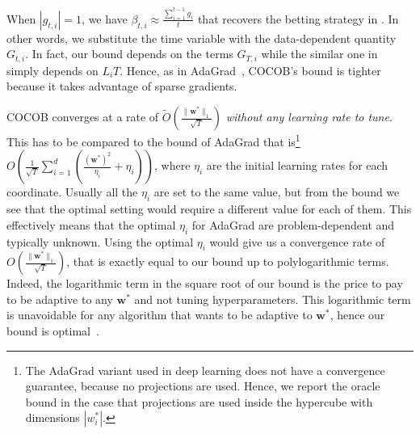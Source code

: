 \documentclass{article}
\newcommand{\bw}{\boldsymbol{w}}
\begin{document}
When $|g_{t,i}|=1$, we have $\beta_{t,i} \approx \tfrac{\sum_{i=1}^{t-1} g_i}{t}$ that recovers the betting strategy in \citet{OrabonaP16b}. In other words, we substitute the time variable with the 
data-dependent quantity $G_{t,i}$. In fact, our bound depends on the terms $G_{T,i}$ while the similar one in \citet{OrabonaP16b} simply depends on 
$L_i T$. Hence, as in AdaGrad~\citep{DuchiHS11}, COCOB's bound is tighter because it takes advantage of sparse gradients.


COCOB converges at a rate of $\tilde{O}(\tfrac{\|\bw^*\|_1}{\sqrt{T}})$ \emph{without any learning rate to tune}. 
This has to be compared to the bound of AdaGrad that is\footnote{The AdaGrad variant used in deep learning does not have 
a convergence guarantee, because no projections are used. Hence, we report the oracle bound in the case that projections 
are used inside the hypercube with dimensions $|w^*_i|$.} $O(\tfrac{1}{\sqrt{T}} \sum_{i=1}^d (\tfrac{(\bw^*)^2}{\eta_i}+\eta_i))$, 
where $\eta_i$ are the initial learning rates for each coordinate. Usually all the $\eta_i$ are set to the same value, 
but from the bound we see that the optimal setting would require a different value for each of them. This effectively means that the optimal $\eta_i$ for AdaGrad are problem-dependent and typically unknown.
Using the optimal $\eta_i$ would give us a convergence rate of $O(\tfrac{\|\bw^*\|_1}{\sqrt{T}})$, 
that is exactly equal to our bound up to polylogarithmic terms.
Indeed, the logarithmic term in the square root of our bound is the price to pay to be adaptive to any $\bw^*$ and 
not tuning hyperparameters. This logarithmic term is unavoidable for any algorithm that wants to be adaptive 
to $\bw^*$, hence our bound is optimal~\citep{Streeter-McMahan-2012, Orabona-2013}.
\end{document}
